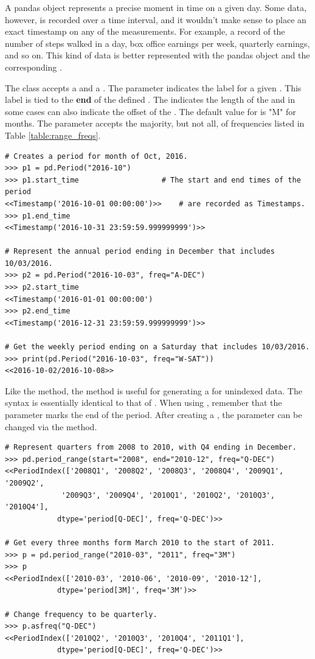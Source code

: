 A pandas  object represents a precise moment in time on a given day.
Some data, however, is recorded over a time interval, and it wouldn't make sense to place an exact timestamp on any of the measurements.
For example, a record of the number of steps walked in a day, box office earnings per week, quarterly earnings, and so on.
This kind of data is better represented with the pandas  object and the corresponding .

The  class accepts a  and a .
The  parameter indicates the label for a given .
This label is tied to the \textbf{end} of the defined .
The  indicates the length of the  and in some cases can also indicate the offset of the .
The default value for  is "M" for months.
The  parameter accepts the majority, but not all, of frequencies listed in Table \ref{table:range_freqs}.

\begin{lstlisting}
# Creates a period for month of Oct, 2016.
>>> p1 = pd.Period("2016-10")
>>> p1.start_time                   # The start and end times of the period
<<Timestamp('2016-10-01 00:00:00')>>    # are recorded as Timestamps.
>>> p1.end_time
<<Timestamp('2016-10-31 23:59:59.999999999')>>

# Represent the annual period ending in December that includes 10/03/2016.
>>> p2 = pd.Period("2016-10-03", freq="A-DEC")
>>> p2.start_time
<<Timestamp('2016-01-01 00:00:00')
>>> p2.end_time
<<Timestamp('2016-12-31 23:59:59.999999999')>>

# Get the weekly period ending on a Saturday that includes 10/03/2016.
>>> print(pd.Period("2016-10-03", freq="W-SAT"))
<<2016-10-02/2016-10-08>>
\end{lstlisting}

Like the  method, the  method is useful for generating a  for unindexed data.
The syntax is essentially identical to that of .
When using , remember that the  parameter marks the end of the period.
After creating a , the  parameter can be changed via the  method.

\begin{lstlisting}
# Represent quarters from 2008 to 2010, with Q4 ending in December.
>>> pd.period_range(start="2008", end="2010-12", freq="Q-DEC")
<<PeriodIndex(['2008Q1', '2008Q2', '2008Q3', '2008Q4', '2009Q1', '2009Q2',
             '2009Q3', '2009Q4', '2010Q1', '2010Q2', '2010Q3', '2010Q4'],
            dtype='period[Q-DEC]', freq='Q-DEC')>>

# Get every three months form March 2010 to the start of 2011.
>>> p = pd.period_range("2010-03", "2011", freq="3M")
>>> p
<<PeriodIndex(['2010-03', '2010-06', '2010-09', '2010-12'],
            dtype='period[3M]', freq='3M')>>

# Change frequency to be quarterly.
>>> p.asfreq("Q-DEC")
<<PeriodIndex(['2010Q2', '2010Q3', '2010Q4', '2011Q1'],
            dtype='period[Q-DEC]', freq='Q-DEC')>>
\end{lstlisting}

